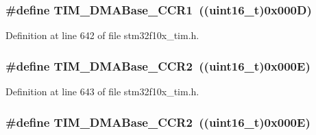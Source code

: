 \subsubsection[{\texorpdfstring{T\+I\+M\+\_\+\+D\+M\+A\+Base\+\_\+\+C\+C\+R1}{TIM_DMABase_CCR1}}]{\setlength{\rightskip}{0pt plus 5cm}\#define T\+I\+M\+\_\+\+D\+M\+A\+Base\+\_\+\+C\+C\+R1~(({\bf uint16\+\_\+t})0x000\+D)}\hypertarget{group___t_i_m___d_m_a___base__address_ga235a47fa47fd19594a111e6e48c0d5a2}{}\label{group___t_i_m___d_m_a___base__address_ga235a47fa47fd19594a111e6e48c0d5a2}


Definition at line 642 of file stm32f10x\+\_\+tim.\+h.

\subsubsection[{\texorpdfstring{T\+I\+M\+\_\+\+D\+M\+A\+Base\+\_\+\+C\+C\+R2}{TIM_DMABase_CCR2}}]{\setlength{\rightskip}{0pt plus 5cm}\#define T\+I\+M\+\_\+\+D\+M\+A\+Base\+\_\+\+C\+C\+R2~(({\bf uint16\+\_\+t})0x000\+E)}\hypertarget{group___t_i_m___d_m_a___base__address_ga0e2150dcd3afe31ecb793aa471b3b972}{}\label{group___t_i_m___d_m_a___base__address_ga0e2150dcd3afe31ecb793aa471b3b972}


Definition at line 643 of file stm32f10x\+\_\+tim.\+h.

\subsubsection[{\texorpdfstring{T\+I\+M\+\_\+\+D\+M\+A\+Base\+\_\+\+C\+C\+R2}{TIM_DMABase_CCR2}}]{\setlength{\rightskip}{0pt plus 5cm}\#define T\+I\+M\+\_\+\+D\+M\+A\+Base\+\_\+\+C\+C\+R2~(({\bf uint16\+\_\+t})0x000\+E)}\hypertarget{group___t_i_m___d_m_a___base__address_ga0e2150dcd3afe31ecb793aa471b3b972}{}\label{group___t_i_m___d_m_a___base__address_ga0e2150dcd3afe31ecb793aa471b3b972}


